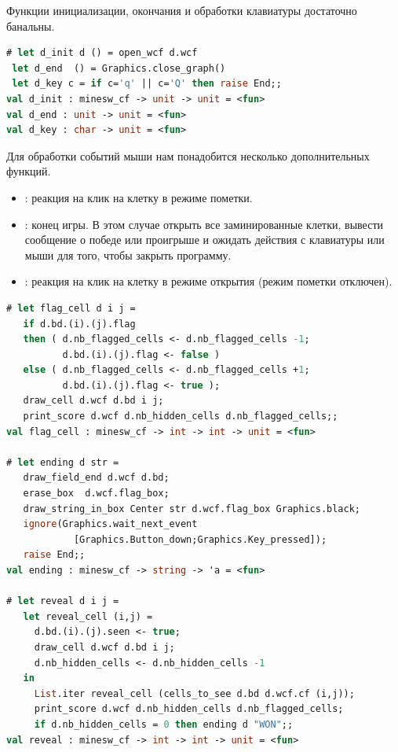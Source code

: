 Функции инициализации, окончания и обработки клавиатуры достаточно банальны.

\begin{lstlisting}[language=OCaml]
# let d_init d () = open_wcf d.wcf
 let d_end  () = Graphics.close_graph()
 let d_key c = if c='q' || c='Q' then raise End;;
val d_init : minesw_cf -> unit -> unit = <fun>
val d_end : unit -> unit = <fun>
val d_key : char -> unit = <fun>
\end{lstlisting}

Для обработки событий мыши нам понадобится несколько дополнительных функций.


\begin{itemize}
	\item {}: реакция на клик на клетку в режиме пометки.

	\item {}: конец игры. В этом случае открыть все заминированные 
клетки, вывести сообщение о победе или проигрыше и ожидать действия с клавиатуры 
или мыши для того, чтобы закрыть программу.

	\item {}: реакция на клик на клетку в режиме открытия (режим 
пометки отключен).
\end{itemize}

\begin{lstlisting}[language=OCaml]
# let flag_cell d i j =
   if d.bd.(i).(j).flag 
   then ( d.nb_flagged_cells <- d.nb_flagged_cells -1; 
          d.bd.(i).(j).flag <- false )
   else ( d.nb_flagged_cells <- d.nb_flagged_cells +1; 
          d.bd.(i).(j).flag <- true );
   draw_cell d.wcf d.bd i j;
   print_score d.wcf d.nb_hidden_cells d.nb_flagged_cells;;
val flag_cell : minesw_cf -> int -> int -> unit = <fun>

# let ending d str = 
   draw_field_end d.wcf d.bd;
   erase_box  d.wcf.flag_box;
   draw_string_in_box Center str d.wcf.flag_box Graphics.black;
   ignore(Graphics.wait_next_event 
            [Graphics.Button_down;Graphics.Key_pressed]);
   raise End;;
val ending : minesw_cf -> string -> 'a = <fun>

# let reveal d i j = 
   let reveal_cell (i,j) = 
     d.bd.(i).(j).seen <- true; 
     draw_cell d.wcf d.bd i j;
     d.nb_hidden_cells <- d.nb_hidden_cells -1 
   in 
     List.iter reveal_cell (cells_to_see d.bd d.wcf.cf (i,j));
     print_score d.wcf d.nb_hidden_cells d.nb_flagged_cells;
     if d.nb_hidden_cells = 0 then ending d "WON";;
val reveal : minesw_cf -> int -> int -> unit = <fun>
\end{lstlisting}

